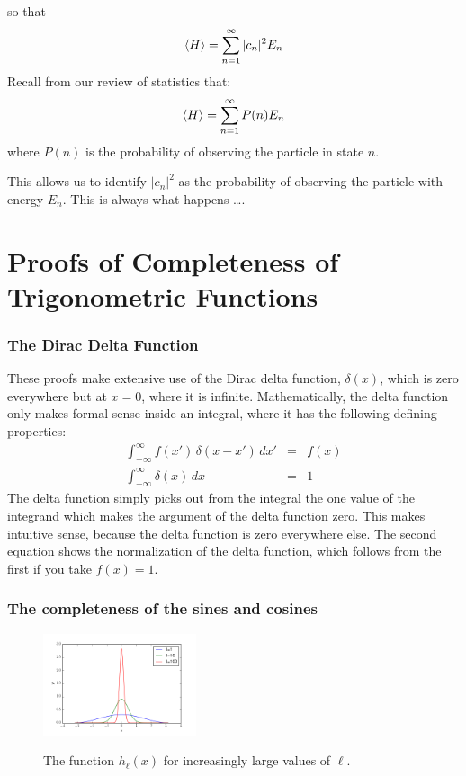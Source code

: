 \documentclass[12pt]{book}
\begin{document}
so that  
\begin{equation}  
\braket{H} = \sum_{n=1}^{\infty} |c_n|^2 E_n
\end{equation}
Recall from our review of statistics that:
\begin{equation}  
\braket{H} = \sum_{n=1}^{\infty} P(n) E_n
\end{equation}
where $P(n)$ is the probability of observing the particle in state $n$.

This allows us to identify $|c_n|^2$ as the probability of observing the particle with energy $E_n$.
This is always what happens \ldots.


\appendix

\chapter{Proofs of Completeness of Trigonometric Functions}


\subsection{The Dirac Delta Function}

These proofs make extensive use of the Dirac delta function, $\delta(x)$, which is zero everywhere but at $x=0$, where it is infinite.  Mathematically, the delta function only makes formal sense inside an integral, where it has the following defining properties:
\begin{eqnarray}
\int_{-\infty}^{\infty} f(x') \, \delta(x-x') \, dx' &=& f(x) \\
\int_{-\infty}^{\infty} \delta(x) \, dx &=& 1 \label{eqn:norm}
 \end{eqnarray}
The delta function simply picks out from the integral the one value of the integrand which makes the argument of the delta function zero.  This makes intuitive sense, because the delta function is zero everywhere else.  The second equation shows the normalization of the delta function, which follows from the first if you take $f(x)=1$.





\subsection{The completeness of the sines and cosines}

\begin{figure}[thb]
\begin{center}
{\includegraphics[width=0.40\textwidth]{figs/hk.png}}
\end{center}
\caption{\label{fig:hl} The function $h_\ell(x)$ for increasingly large values of $\ell$.}
\end{figure}
\end{document}
